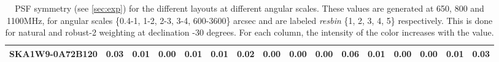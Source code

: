 \begin{table}[!htp]
{{\begin{tabular}{|lccccc||ccccc||ccccc|}
SKA1W9-0A72B120 & 0.03 \cellcolor{blue!18.00} & 0.01 \cellcolor{red!18.00} & 0.00 \cellcolor{green!18.00} & 0.01 \cellcolor{orange!60.00} & 0.01 \cellcolor{purple!18.00} & 0.02 \cellcolor{blue!18.00} & 0.00 \cellcolor{red!18.00} & 0.00 \cellcolor{green!18.00} & 0.00 \cellcolor{orange!18.00} & 0.06 \cellcolor{purple!60.00} & 0.01 \cellcolor{blue!18.00} & 0.00 \cellcolor{red!18.00} & 0.00 \cellcolor{green!18.00} & 0.01 \cellcolor{orange!60.00} & 0.03 \cellcolor{purple!18.00}\\ \hline 
\end{tabular}}
\hspace{1cm} 

\vspace{.0cm}
\caption{PSF symmetry (see \autoref{sec:exp})  for the different layouts at different angular scales. These values are generated at 650, 800 and 1100MHz, for angular scales \{0.4-1, 1-2, 2-3, 3-4, 600-3600\} arcsec and are labeled {\it resbin} \{1, 2, 3, 4, 5\} respectively. This is done for natural and robust-2 weighting at declination -30 degrees. For each column, the intensity of the color increases with the value.}\label{tab:psf_sym}}
 \end{table}
